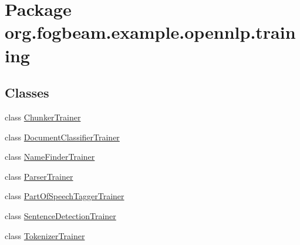 \hypertarget{namespaceorg_1_1fogbeam_1_1example_1_1opennlp_1_1training}{}\section{Package org.\+fogbeam.\+example.\+opennlp.\+training}
\label{namespaceorg_1_1fogbeam_1_1example_1_1opennlp_1_1training}
\subsection*{Classes}
\begin{DoxyCompactItemize}
\item 
class \hyperlink{classorg_1_1fogbeam_1_1example_1_1opennlp_1_1training_1_1_chunker_trainer}{Chunker\+Trainer}
\item 
class \hyperlink{classorg_1_1fogbeam_1_1example_1_1opennlp_1_1training_1_1_document_classifier_trainer}{Document\+Classifier\+Trainer}
\item 
class \hyperlink{classorg_1_1fogbeam_1_1example_1_1opennlp_1_1training_1_1_name_finder_trainer}{Name\+Finder\+Trainer}
\item 
class \hyperlink{classorg_1_1fogbeam_1_1example_1_1opennlp_1_1training_1_1_parser_trainer}{Parser\+Trainer}
\item 
class \hyperlink{classorg_1_1fogbeam_1_1example_1_1opennlp_1_1training_1_1_part_of_speech_tagger_trainer}{Part\+Of\+Speech\+Tagger\+Trainer}
\item 
class \hyperlink{classorg_1_1fogbeam_1_1example_1_1opennlp_1_1training_1_1_sentence_detection_trainer}{Sentence\+Detection\+Trainer}
\item 
class \hyperlink{classorg_1_1fogbeam_1_1example_1_1opennlp_1_1training_1_1_tokenizer_trainer}{Tokenizer\+Trainer}
\end{DoxyCompactItemize}
